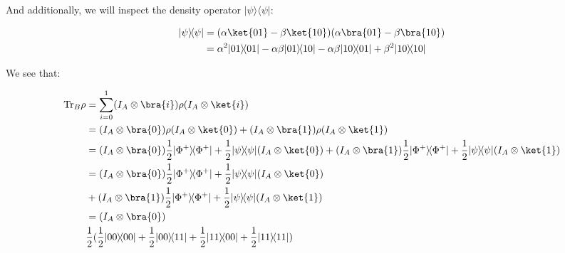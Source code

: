 \documentclass{article}
\def\I{I}
\newcommand{\ketbra}[2]{|#1\rangle\!\langle #2|}
\newcommand{\trace}{{\rm Tr}}
\begin{document}
\begin{enumerate}
        And additionally, we will inspect the density operator $\ketbra{\psi}{\psi}$:

        $$\begin{aligned}
            \ketbra{\psi}{\psi} & = (\alpha\ket{01}-\beta\ket{10})(\alpha\bra{01}-\beta\bra{10})                                         \\
                                & = \alpha^2\ketbra{01}{01}-\alpha\beta\ketbra{01}{10}-\alpha\beta\ketbra{10}{01}+\beta^2\ketbra{10}{10} \\
          \end{aligned}$$

        We see that:

        $$\begin{aligned}
            \trace_B{\rho} & =\sum_{i=0}^1(\I_A\otimes\bra{i})\rho(\I_A\otimes\ket{i})                                                                                                                                                            \\
                           & =(I_A\otimes\bra{0})\rho(I_A\otimes\ket{0})+(I_A\otimes\bra{1})\rho(I_A\otimes\ket{1})                                                                                                                               \\
                           & =(I_A\otimes\bra{0})\frac{1}{2}\ketbra{\Phi^+}{\Phi^+} + \frac{1}{2}\ketbra{\psi}{\psi}(I_A\otimes\ket{0})+(I_A\otimes\bra{1})\frac{1}{2}\ketbra{\Phi^+}{\Phi^+} + \frac{1}{2}\ketbra{\psi}{\psi}(I_A\otimes\ket{1}) \\
                           & =(I_A\otimes\bra{0})\frac{1}{2}\ketbra{\Phi^+}{\Phi^+} + \frac{1}{2}\ketbra{\psi}{\psi}(I_A\otimes\ket{0})                                                                                                           \\
                           & +(I_A\otimes\bra{1})\frac{1}{2}\ketbra{\Phi^+}{\Phi^+} + \frac{1}{2}\ketbra{\psi}{\psi}(I_A\otimes\ket{1})                                                                                                           \\
                           & =(I_A\otimes\bra{0})                                                                                                                                                                                                 \\
                           & \frac{1}{2}(\frac12\ketbra{00}{00}+\frac12\ketbra{00}{11}+\frac12\ketbra{11}{00}+\frac12\ketbra{11}{11})                                                                                                             \\

\end{aligned}$$
\end{enumerate}
\end{document}
